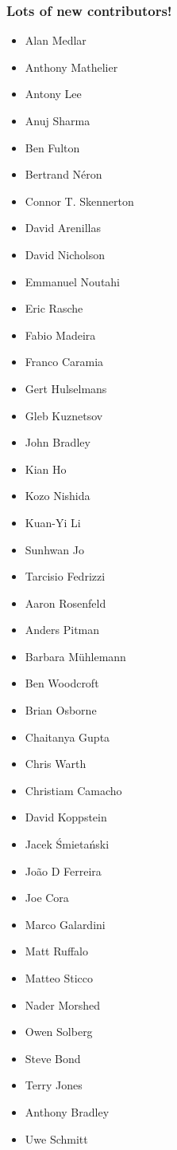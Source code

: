 \documentclass[trans]{beamer}
\begin{document}
{
  \frametitle{Lots of new contributors!}
  
  \scriptsize{
  \begin{multicols}{3}
  \begin{itemize}
  \item Alan Medlar
  \item Anthony Mathelier
  \item Antony Lee
  \item Anuj Sharma
  \item Ben Fulton
  \item Bertrand Néron
  \item Connor T. Skennerton
  \item David Arenillas
  \item David Nicholson
  \item Emmanuel Noutahi
  \item Eric Rasche
  \item Fabio Madeira
  \item Franco Caramia
  \item Gert Hulselmans
  \item Gleb Kuznetsov
  \item John Bradley
  \item Kian Ho
  \item Kozo Nishida
  \item Kuan-Yi Li
  \item Sunhwan Jo
  \item Tarcisio Fedrizzi

  \item Aaron Rosenfeld
  \item Anders Pitman
  \item Barbara Mühlemann
  \item Ben Woodcroft
  \item Brian Osborne
  \item Chaitanya Gupta
  \item Chris Warth
  \item Christiam Camacho
  \item David Koppstein
  \item Jacek Śmietański
  \item João D Ferreira
  \item Joe Cora
  \item Marco Galardini
  \item Matt Ruffalo
  \item Matteo Sticco
  \item Nader Morshed
  \item Owen Solberg
  \item Steve Bond
  \item Terry Jones

  \item Anthony Bradley
  \item Uwe Schmitt
  \end{itemize}
  \end{multicols}
  }
}
\end{document}
